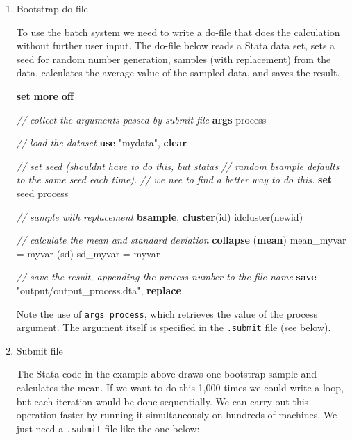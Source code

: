 \documentclass[
]{book}
\newenvironment{Shaded}{\begin{snugshade}}{\end{snugshade}}
\newcommand{\CommentTok}[1]{\textcolor[rgb]{0.56,0.35,0.01}{\textit{#1}}}
\newcommand{\DecValTok}[1]{\textcolor[rgb]{0.00,0.00,0.81}{#1}}
\newcommand{\FunctionTok}[1]{\textcolor[rgb]{0.00,0.00,0.00}{#1}}
\newcommand{\KeywordTok}[1]{\textcolor[rgb]{0.13,0.29,0.53}{\textbf{#1}}}
\newcommand{\NormalTok}[1]{#1}
\newcommand{\OtherTok}[1]{\textcolor[rgb]{0.56,0.35,0.01}{#1}}
\newcommand{\StringTok}[1]{\textcolor[rgb]{0.31,0.60,0.02}{#1}}
\begin{document}
\begin{enumerate}
\def\labelenumi{\arabic{enumi}.}
\item
  Bootstrap do-file

  To use the batch system we need to write a do-file that does the
  calculation without further user input. The do-file below reads a Stata
  data set, sets a seed for random number generation, samples (with
  replacement) from the data, calculates the average value of the sampled
  data, and saves the result.

\begin{Shaded}
\begin{Highlighting}[]
\KeywordTok{set} \KeywordTok{more} \KeywordTok{off}

\CommentTok{// collect the arguments passed by submit file}
\KeywordTok{args}\NormalTok{ process}

\CommentTok{// load the dataset}
\KeywordTok{use} \StringTok{"mydata"}\NormalTok{, }\KeywordTok{clear}

\CommentTok{// set seed (shouldn\textquotesingle{}t have to do this, but stata\textquotesingle{}s}
\CommentTok{// random bsample defaults to the same seed each time).}
\CommentTok{// we nee to find a better way to do this.}
\KeywordTok{set} \DecValTok{seed} \OtherTok{\textasciigrave{}process\textquotesingle{}}

\CommentTok{// sample with replacement}
\KeywordTok{bsample}\NormalTok{, }\KeywordTok{cluster}\NormalTok{(id) idcluster(newid)}

\CommentTok{// calculate the mean and standard deviation}
\KeywordTok{collapse}\NormalTok{ (}\KeywordTok{mean}\NormalTok{) mean\_myvar = myvar (}\FunctionTok{sd}\NormalTok{) sd\_myvar = myvar}

\CommentTok{// save the result, appending the process number to the file name}
\KeywordTok{save} \StringTok{"output/output\_\textasciigrave{}process\textquotesingle{}.dta"}\NormalTok{, }\KeywordTok{replace}
\end{Highlighting}
\end{Shaded}

  Note the use of \texttt{args\ process}, which retrieves the value of the process
  argument. The argument itself is specified in the \texttt{.submit} file (see
  below).
\item
  Submit file

  The Stata code in the example above draws one bootstrap sample and
  calculates the mean. If we want to do this 1,000 times we could write a
  loop, but each iteration would be done sequentially. We can carry out
  this operation faster by running it simultaneously on hundreds of
  machines. We just need a \texttt{.submit} file like the one below:


\end{enumerate}
\end{document}
